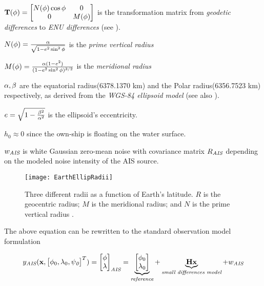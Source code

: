 \begin{description}
	\item $\mathbf{T}({\phi})=
	\begin{bmatrix}
	N({\phi})\cos{\phi} &0\\
	0 &M({\phi})
	\end{bmatrix}
	$ is the transformation matrix from \emph{geodetic differences} to \emph{ENU differences} (see ).
	\item $N({\phi}) = \frac{{\alpha}}{\sqrt{1-e^2\sin^2{\phi}}}$ is the \emph{prime vertical radius}
	\item $M({\phi}) = \frac{{\alpha}(1-e^2)}{(1-e^2\sin^2{\phi})^{3/2}}$ is the \emph{meridional radius}
	\item ${\alpha},{\beta}$ are the equatorial radius(6378.1370 km) and the Polar radius(6356.7523 km) respectively, as derived from the \emph{WGS-84 ellipsoid model} \cite{Farrell2008} (see also ).
	\item $e = \sqrt{1 -\frac{{\beta}^2}{{\alpha}^2}}$ is the ellipsoid's eccentricity.
	\item $h _0 \approx 0 $ since the own-ship is floating on the water surface.
	\item ${w}_{\textit{AIS}}$ is white Gaussian zero-mean noise with covariance matrix ${R}_{\textit{AIS}}$ depending on the modeled noise intensity of the AIS source.
\end{description}

\begin{figure}
	\centering
	\texttt{[image: EarthEllipRadii]}
	\caption{Three different radii as a function of Earth's latitude. $R$ is the geocentric radius; $M$ is the meridional radius; and $N$ is the prime vertical radius \cite{nima2000}.}
	\label{fig:earthellipradii}
\end{figure}


The above equation can be rewritten to the standard observation model formulation

\begin{equation}
{{y}}_{\textit{AIS}}(\mathbf{x},\begin{bmatrix}{\phi}_{0}, {\lambda}_{0}, {\psi}_{\textit{0}} \end{bmatrix}^{T}) = \begin{bmatrix}
{\phi}\\ {\lambda}
\end{bmatrix}_{\textit{AIS}} = \underbrace{\begin{bmatrix}
{\phi}_{0}\\ {\lambda}_{0}
\end{bmatrix}}_{\textit{reference}} + \underbrace{\mathbf{H}\mathbf{x} }_{\textit{small differences model}} + {w}_{\textit{AIS}}
\end{equation}

